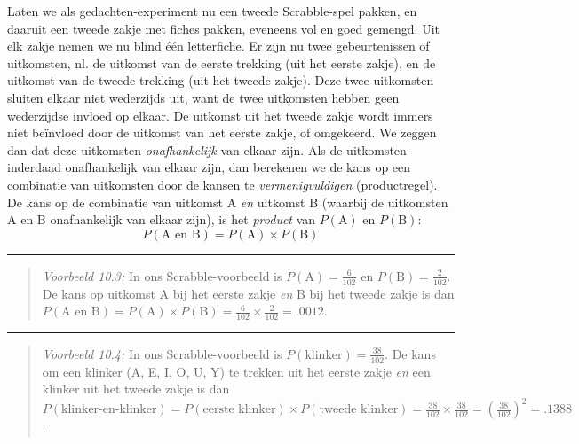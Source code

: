 \documentclass[
]{book}
\begin{document}
Laten we als gedachten-experiment nu een tweede Scrabble-spel pakken, en
daaruit een tweede zakje met fiches pakken, eveneens vol en goed
gemengd. Uit elk zakje nemen we nu blind één letterfiche. Er zijn nu
twee gebeurtenissen of uitkomsten, nl. de uitkomst van de eerste
trekking (uit het eerste zakje), en de uitkomst van de tweede trekking
(uit het tweede zakje). Deze twee uitkomsten sluiten elkaar niet
wederzijds uit, want de twee uitkomsten hebben geen wederzijdse invloed
op elkaar. De uitkomst uit het tweede zakje wordt immers niet beïnvloed
door de uitkomst van het eerste zakje, of omgekeerd. We zeggen dan dat
deze uitkomsten \emph{onafhankelijk} van elkaar zijn. Als de uitkomsten
inderdaad onafhankelijk van elkaar zijn, dan berekenen we de kans op een
combinatie van uitkomsten door de kansen te \emph{vermenigvuldigen}
(productregel). De kans op de combinatie van uitkomst A \emph{en} uitkomst B
(waarbij de uitkomsten A en B onafhankelijk van elkaar zijn), is het
\emph{product} van \(P(\textrm{A})\) en \(P(\textrm{B})\):
\begin{equation}
    P(\textrm{A en B}) = P(\textrm{A}) \times P(\textrm{B})
  \label{eq:kans-productregel}
\end{equation}

\begin{center}\rule{0.5\linewidth}{0.5pt}\end{center}

\begin{quote}
\emph{Voorbeeld 10.3:}
In ons Scrabble-voorbeeld is \(P(\textrm{A})=\frac{6}{102}\) en
\(P(\textrm{B})=\frac{2}{102}\). De kans op uitkomst A bij het eerste
zakje \emph{en} B bij het tweede zakje is dan
\(P(\textrm{A en B})=P(\textrm{A}) \times P(\textrm{B})=\frac{6}{102} \times \frac{2}{102} = .0012\).
\end{quote}

\begin{center}\rule{0.5\linewidth}{0.5pt}\end{center}

\begin{quote}
\emph{Voorbeeld 10.4:}
In ons Scrabble-voorbeeld is \(P(\textrm{klinker})=\frac{38}{102}\). De kans
om een klinker (A, E, I, O, U, Y) te trekken uit het eerste zakje \emph{en}
een klinker uit het tweede zakje is dan
\(P(\textrm{klinker-en-klinker})=P(\textrm{eerste klinker}) \times P(\textrm{tweede klinker})=\frac{38}{102} \times \frac{38}{102} = (\frac{38}{102})^2 = .1388\).
\end{quote}
\end{document}
